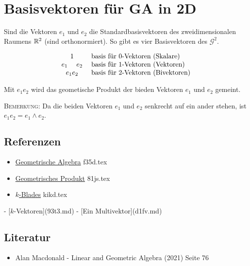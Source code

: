 \documentclass{sajzk}
\begin{document}
\section{Basisvektoren für GA in 2D}
\label{e6nk}

Sind die Vektoren $e_1$ und $e_2$ die Standardbasisvektoren des
zweidimensionalen Raumens $\mathbb{R}^2$ (sind orthonormiert). So gibt es vier
Basisvektoren des $\mathscr{G}^2$.

\[
\begin{matrix}
    1 \\ 
    e_1\hspace{3ex} e_2 \\ 
    e_1e_2
\end{matrix}
\hspace{3ex}
\begin{matrix*}[l]
    \textrm{basis für }0\textrm{-Vektoren (Skalare)} \\ 
    \textrm{basis für }1\textrm{-Vektoren (Vektoren)} \\ 
    \textrm{basis für }2\textrm{-Vektoren (Bivektoren)} \\ 
\end{matrix*}
\]

Mit $e_1e_2$ wird das geometische Produkt der bieden Vektoren $e_1$ und $e_2$
gemeint.

\textsc{Bemerkung:} Da die beiden Vektoren $e_1$ und $e_2$ senkrecht auf ein ander
stehen, ist $e_1e_2 = e_1\wedge e_2$.

\subsection{Referenzen}
\begin{itemize}
    \item \href{f35d.pdf}{Geometrische Algebra} f35d.tex
    \item \href{81js.pdf}{Geometrisches Produkt} 81js.tex
    \item \href{kikd.pdf}{$k$-Blades} kikd.tex
\end{itemize}

- [$k$-Vektoren](93t3.md)
- [Ein Multivektor](d1fv.md)

\subsection{Literatur}
\begin{itemize}
    \item Alan Macdonald - Linear and Geometric Algebra (2021) Seite 76
\end{itemize}
\end{document}
